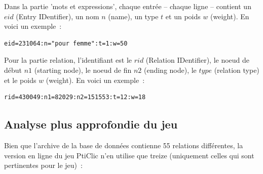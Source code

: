 \documentclass[a4paper,11pt,french]{article}
\begin{document}
Dans la partie 'mots et expressions', chaque entrée -- chaque ligne -- contient un $eid$ (Entry IDentifier), un nom $n$ (name), un type $t$ et un poids $w$ (weight). En voici un exemple~:
\indent%
\begin{verbatim}
eid=231064:n="pour femme":t=1:w=50
\end{verbatim}

Pour la partie relation, l'identifiant est le $rid$ (Relation IDentifier), le noeud de début $n1$ (starting node), le noeud de fin $n2$ (ending node), le $type$ (relation type) et le poids $w$ (weight). En voici un exemple~:
\begin{verbatim}
rid=430049:n1=82029:n2=151553:t=12:w=18
\end{verbatim}

\subsection{Analyse plus approfondie du jeu}
Bien que l'archive de la base de données contienne 55 relations différentes, la version en ligne du jeu PtiClic n'en utilise que treize (uniquement celles qui sont pertinentes pour le jeu)~:
\end{document}
